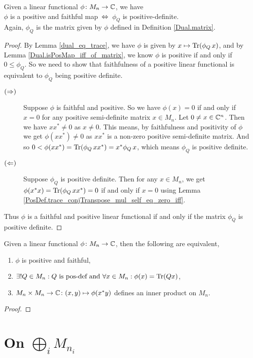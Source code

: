   \begin{proposition}\label{Dual.isFaithfulPosMap_iff}
    \leanok
    Given a linear functional $\phi\colon{M_n}\to\mathbb{C}$, we have\\
    \hspace*{0.5cm}$\phi$ is a positive and faithful map $\,\Leftrightarrow\,$ $\phi_Q$ is positive-definite.\\
    Again, $\phi_Q$ is the matrix given by $\phi$ defined in Definition \ref{Dual.matrix}.
   \end{proposition}
   \begin{proof}\leanok
    By Lemma \ref{dual_eq_trace}, we have $\phi$ is given by $x\mapsto\operatorname{Tr}(\phi_Q\, x)$, and by Lemma \ref{Dual.isPosMap_iff_of_matrix}, we know $\phi$ is positive if and only if $0\leq\phi_Q$.
    So we need to show that faithfulness of a positive linear functional is equivalent to $\phi_Q$ being positive definite.
    \begin{description}
     \item[$(\Rightarrow)$]
      Suppose $\phi$ is faithful and positive.
      So we have $\phi(x)=0$ if and only if $x=0$ for any positive semi-definite matrix $x\in{M_n}$.
      Let $0\neq{x}\in\mathbb{C}^n$. Then we have $xx^*\neq0$ as $x\neq0$. This means, by faithfulness and positivity of $\phi$ we get $\phi(xx^*)\neq0$ as $xx^*$ is a non-zero positive semi-definite matrix. And so $0<\phi(xx^*)=\operatorname{Tr}(\phi_Q\, xx^*)=x^*\phi_Q\, x$, which means $\phi_Q$ is positive definite.
     \item[$(\Leftarrow)$]
      Suppose $\phi_Q$ is positive definite. Then for any $x\in{M_n}$, we get $\phi(x^*x)=\operatorname{Tr}(\phi_Q\, xx^*)=0$ if and only if $x=0$ using Lemma \ref{PosDef.trace_conjTranspose_mul_self_eq_zero_iff}.
    \end{description}
    Thus $\phi$ is a faithful and positive linear functional if and only if the matrix $\phi_Q$ is positive definite.
   \end{proof}

  \begin{theorem}\label{Dual.isFaithfulPosMap_tfae}
   Given a linear functional $\phi\colon{M_n}\to\mathbb{C}$, then the following are equivalent,
   \begin{enumerate}[label=(\roman*)]
    \item $\phi$ is positive and faithful,
    \item $\exists!Q\in{M_n}:Q\text{ is pos-def and }\forall{x}\in{M_n}:\phi(x)=\operatorname{Tr}(Qx)$,
    \item $M_n\times{M_n}\to\mathbb{C}\colon(x,y)\mapsto\phi(x^*y)$ defines an inner product on $M_n$.
   \end{enumerate}
  \end{theorem}
  \begin{proof}
  \end{proof}

 \section{On $\bigoplus_i M_{n_i}$}
  
 


 
